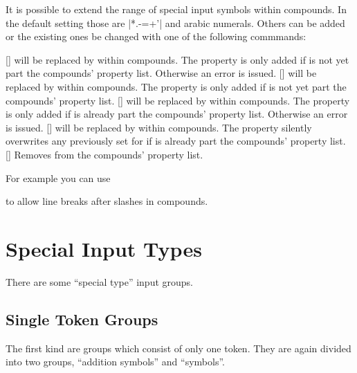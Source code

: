 \documentclass[load-preamble+]{cnltx-doc}
\begin{document}
It is possible to extend the range of special input symbols
within compounds.  In the default setting those are \verbcode|*.-=+'| and
arabic numerals.  Others can be added or the existing ones be changed with one
of the following commmands:
\begin{commands}
  []
     will be replaced by  within compounds.  The
    property is only added if  is not yet part the compounds'
    property list. Otherwise an error is issued.
  []
     will be replaced by 
    within compounds.  The property is only added if  is not yet
    part the compounds' property list.
  []
     will be replaced by  within compounds.  The
    property is only added if  is already part the compounds'
    property list. Otherwise an error is issued.
  []
     will be replaced by  within compounds.  The
    property silently overwrites any previously set  for
     if  is already part the compounds' property
    list.
  []
    Removes  from the compounds' property list.
\end{commands}

For example you can use
\begin{sourcecode}
  \NewChemCompoundProperty{\}{\slash}
\end{sourcecode}
to allow line breaks after slashes in compounds.

\section{Special Input Types}
There are some \enquote{special type} input groups.

\subsection{Single Token Groups}
The first kind are groups which consist of only one token.  They are again
divided into two groups, \enquote{addition symbols} and \enquote{symbols}.
\end{document}
